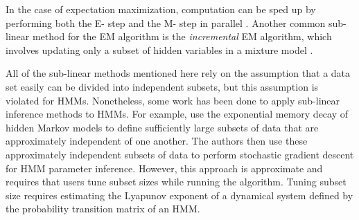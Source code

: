 In the case of expectation maximization, computation can be sped up by performing both the E- step and the M- step in parallel \citep{Lee:2021}. Another common sub-linear method for the EM algorithm is the \textit{incremental} EM algorithm, which involves updating only a subset of hidden variables in a mixture model \citep{Neal:1998, Thiesson:2001, Karimi:2019}. %


All of the sub-linear methods mentioned here rely on the assumption that a data set easily can be divided into independent subsets, but this assumption is violated for HMMs. Nonetheless, some work has been done to apply sub-linear inference methods to HMMs.
For example, \citet{Ye:2017} use the exponential memory decay of hidden Markov models to define sufficiently large subsets of data that are approximately independent of one another. The authors then use these approximately independent subsets of data to perform stochastic gradient descent for HMM parameter inference. However, this approach is approximate and requires that users tune subset sizes while running the algorithm. Tuning subset size requires estimating the Lyapunov exponent of a dynamical system defined by the probability transition matrix of an HMM.

